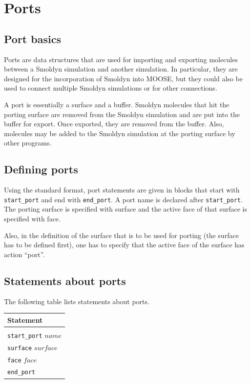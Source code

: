 \documentclass {book}
\newcommand {\ttt} {\texttt}
\begin{document}
\chapter{Ports}

\section{Port basics}

Ports are data structures that are used for importing and exporting molecules between a Smoldyn simulation and another simulation. In particular, they are designed for the incorporation of Smoldyn into MOOSE, but they could also be used to connect multiple Smoldyn simulations or for other connections.

A port is essentially a surface and a buffer. Smoldyn molecules that hit the porting surface are removed from the Smoldyn simulation and are put into the buffer for export. Once exported, they are removed from the buffer. Also, molecules may be added to the Smoldyn simulation at the porting surface by other programs.

\section{Defining ports}

Using the standard format, port statements are given in blocks that start with \ttt{start\_port} and end with \ttt{end\_port}. A port name is declared after \ttt{start\_port}. The porting surface is specified with surface and the active face of that surface is specified with face.

Also, in the definition of the surface that is to be used for porting (the surface has to be defined first), one has to specify that the active face of the surface has action ``port''.

\section{Statements about ports}

The following table lists statements about ports.

\begin{longtable}[c]{l}
Statement\\
\hline \\
\ttt{start\_port} $name$\\
\ttt{surface} $surface$\\
\ttt{face} $face$\\
\ttt{end\_port}
\end{longtable}
\end{document}
